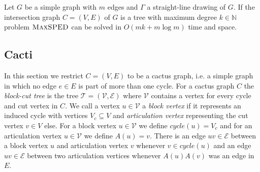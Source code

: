 \documentclass[a4paper,english,numberwithinsect]{eurocg18}
\newcommand{\maxsped}{\ensuremath{\textsc{MaxSPED}}\xspace}
\newcommand{\sollong}{\ensuremath{\textit{long}}\xspace}
\newcommand{\solshort}{\ensuremath{\textit{short}}\xspace}
\begin{document}
\begin{theorem}
	\label{thm:tree}
	Let $ G $ be a simple graph with $m$ edges and $ \Gamma $ a straight-line drawing of $ G $. If the intersection graph $ C = (V,E) $ of $ G $ is a tree with maximum degree $ k \in \mathbb{N} $ problem \maxsped can be solved in $ O(mk + m \log m) $ time and space.
\end{theorem}
%
%
%


\subsection{Cacti}
\label{sec:cactus}
In this section we restrict $ C = (V,E) $ to be a cactus graph, i.e. a simple graph in which no edge $ e \in E $ is part of more than one cycle. For a cactus graph $ C $ the \emph{block-cut tree} is the tree $ \mathcal T = (\mathcal V, \mathcal E) $ where $ \mathcal V $ contains a vertex for every cycle and cut vertex in $ C $. We call a vertex $ u \in \mathcal V $ a \emph{block vertex} if it represents an induced cycle with vertices $ V_c \subseteq V $ and \emph{articulation vertex} representing the cut vertex $ v \in V $ else. For a block vertex $ u \in \mathcal V $ we define $ \textit{cycle}(u) = V_c$ and for an articulation vertex $ u \in \mathcal V $ we define $ A(u) = v $. There is an edge $ uv \in \mathcal E $ between a block vertex $ u $ and articulation vertex $ v $ whenever $ v \in \textit{cycle}(u) $ and an edge $ uv \in \mathcal E $ between two articulation vertices whenever $ A(u)A(v) $ was an edge in $ E $.
\end{document}
